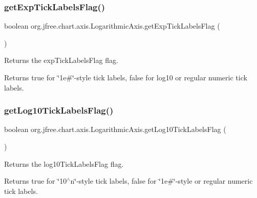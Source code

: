 \subsubsection{\texorpdfstring{get\+Exp\+Tick\+Labels\+Flag()}{getExpTickLabelsFlag()}}
{\footnotesize\ttfamily boolean org.\+jfree.\+chart.\+axis.\+Logarithmic\+Axis.\+get\+Exp\+Tick\+Labels\+Flag (\begin{DoxyParamCaption}{ }\end{DoxyParamCaption})}

Returns the \textquotesingle{}exp\+Tick\+Labels\+Flag\textquotesingle{} flag.

\begin{DoxyReturn}{Returns}
{\ttfamily true} for \char`\"{}1e\#\char`\"{}-\/style tick labels, {\ttfamily false} for log10 or regular numeric tick labels. 
\end{DoxyReturn}
\mbox{\label{classorg_1_1jfree_1_1chart_1_1axis_1_1_logarithmic_axis_a2368f5441388f88750833c8aabf3b030}} 
\subsubsection{\texorpdfstring{get\+Log10\+Tick\+Labels\+Flag()}{getLog10TickLabelsFlag()}}
{\footnotesize\ttfamily boolean org.\+jfree.\+chart.\+axis.\+Logarithmic\+Axis.\+get\+Log10\+Tick\+Labels\+Flag (\begin{DoxyParamCaption}{ }\end{DoxyParamCaption})}

Returns the \textquotesingle{}log10\+Tick\+Labels\+Flag\textquotesingle{} flag.

\begin{DoxyReturn}{Returns}
{\ttfamily true} for \char`\"{}10$^\wedge$n\char`\"{}-\/style tick labels, {\ttfamily false} for \char`\"{}1e\#\char`\"{}-\/style or regular numeric tick labels. 
\end{DoxyReturn}
\mbox{\label{classorg_1_1jfree_1_1chart_1_1axis_1_1_logarithmic_axis_ae256688d8ed50b3cff30c8a1cb6c167a}} 
